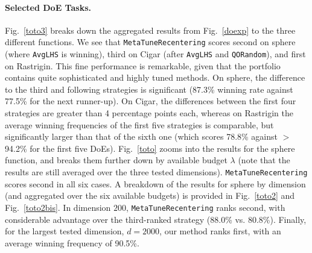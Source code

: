 \paragraph{Selected DoE Tasks.} 
Fig.~\ref{toto3} breaks down the aggregated results from Fig.~\ref{doexp} to the three different functions. We see that \texttt{MetaTuneRecentering} scores second on sphere (where \texttt{AvgLHS} is winning), third on Cigar (after \texttt{AvgLHS} and \texttt{QORandom}), and first on Rastrigin. This fine performance is remarkable, given that the portfolio contains quite sophisticated and highly tuned methods.  On sphere, the difference to the third and following strategies is significant (87.3\% winning rate against 77.5\% for the next runner-up). On Cigar, the differences between the first four strategies are greater than 4 percentage points each, whereas on Rastrigin the average winning frequencies of the first five strategies is comparable, but significantly larger than that of the sixth one (which scores 78.8\% against $>$94.2\% for the first five DoEs). 
Fig.~\ref{toto} zooms into the results for the sphere function, and breaks them further down by available budget $\lambda$ (note that the results are still averaged over the three tested dimensions). \texttt{MetaTuneRecentering} scores second in all six cases. 
A breakdown of the results for sphere by dimension (and aggregated over the six available budgets) is provided in Fig.~\ref{toto2} and Fig.~\ref{toto2bis}. 
In dimension $200$, \texttt{MetaTuneRecentering} ranks second, with considerable advantage over the third-ranked strategy (88.0\% vs. 80.8\%). Finally, for the largest tested dimension, $d=2000$, our method ranks first, with an average winning frequency of 90.5\%.  
